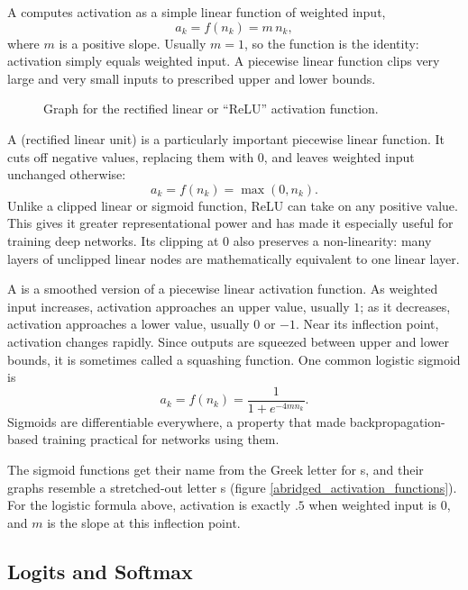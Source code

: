 A  computes activation as a simple linear function of weighted input,
\[
 a_k=f(n_k)=m\,n_k,
\]
where $m$ is a positive slope. Usually $m=1$, so the function is the identity: activation simply equals weighted input. A piecewise linear function clips very large and very small inputs to prescribed upper and lower bounds.

\begin{figure}[h]
\centering
{}
\caption[Scott Hotton.]{Graph for the rectified linear or ``ReLU'' activation function.}
\label{abridged_relu}
\end{figure}

A  (rectified linear unit) is a particularly important piecewise linear function. It cuts off negative values, replacing them with $0$, and leaves weighted input unchanged otherwise:
\[
 a_k=f(n_k)=\max(0,n_k).
\]
Unlike a clipped linear or sigmoid function, ReLU can take on any positive value. This gives it greater representational power and has made it especially useful for training deep networks. Its clipping at $0$ also preserves a non-linearity: many layers of unclipped linear nodes are mathematically equivalent to one linear layer.


A  is a smoothed version of a piecewise linear activation function. As weighted input increases, activation approaches an upper value, usually $1$; as it decreases, activation approaches a lower value, usually $0$ or $-1$. Near its inflection point, activation changes rapidly. Since outputs are squeezed between upper and lower bounds, it is sometimes called a squashing function. One common logistic sigmoid is
\[
 a_k=f(n_k)=\frac{1}{1+e^{-4mn_k}}.
\]
Sigmoids are differentiable everywhere, a property that made backpropagation-based training practical for networks using them.

The sigmoid functions get their name from the Greek letter for s, and their graphs resemble a stretched-out letter s (figure \ref{abridged_activation_functions}). For the logistic formula above, activation is exactly $.5$ when weighted input is $0$, and $m$ is the slope at this inflection point.

\subsection{Logits and Softmax}

